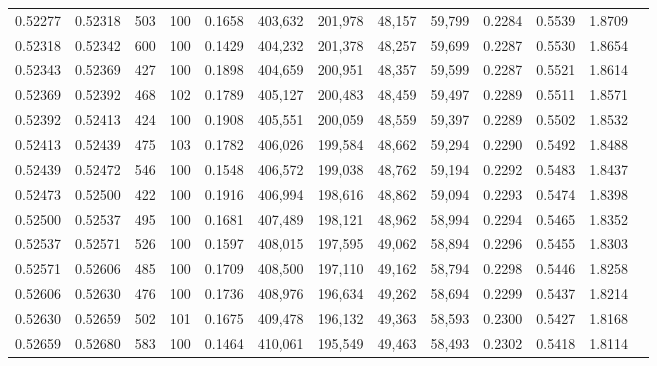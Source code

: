 \begin{tabular}{rrrrrrrrrrrrr}
0.52277 & 0.52318 &   503 & 100 &                                     0.1658 & 403,632 & 201,978 &  48,157 &  59,799 & 0.2284 & 0.5539 & 1.8709 \\
0.52318 & 0.52342 &   600 & 100 &                                     0.1429 & 404,232 & 201,378 &  48,257 &  59,699 & 0.2287 & 0.5530 & 1.8654 \\
0.52343 & 0.52369 &   427 & 100 &                                     0.1898 & 404,659 & 200,951 &  48,357 &  59,599 & 0.2287 & 0.5521 & 1.8614 \\
0.52369 & 0.52392 &   468 & 102 &                                     0.1789 & 405,127 & 200,483 &  48,459 &  59,497 & 0.2289 & 0.5511 & 1.8571 \\
0.52392 & 0.52413 &   424 & 100 &                                     0.1908 & 405,551 & 200,059 &  48,559 &  59,397 & 0.2289 & 0.5502 & 1.8532 \\
0.52413 & 0.52439 &   475 & 103 &                                     0.1782 & 406,026 & 199,584 &  48,662 &  59,294 & 0.2290 & 0.5492 & 1.8488 \\
0.52439 & 0.52472 &   546 & 100 &                                     0.1548 & 406,572 & 199,038 &  48,762 &  59,194 & 0.2292 & 0.5483 & 1.8437 \\
0.52473 & 0.52500 &   422 & 100 &                                     0.1916 & 406,994 & 198,616 &  48,862 &  59,094 & 0.2293 & 0.5474 & 1.8398 \\
0.52500 & 0.52537 &   495 & 100 &                                     0.1681 & 407,489 & 198,121 &  48,962 &  58,994 & 0.2294 & 0.5465 & 1.8352 \\
0.52537 & 0.52571 &   526 & 100 &                                     0.1597 & 408,015 & 197,595 &  49,062 &  58,894 & 0.2296 & 0.5455 & 1.8303 \\
0.52571 & 0.52606 &   485 & 100 &                                     0.1709 & 408,500 & 197,110 &  49,162 &  58,794 & 0.2298 & 0.5446 & 1.8258 \\
0.52606 & 0.52630 &   476 & 100 &                                     0.1736 & 408,976 & 196,634 &  49,262 &  58,694 & 0.2299 & 0.5437 & 1.8214 \\
0.52630 & 0.52659 &   502 & 101 &                                     0.1675 & 409,478 & 196,132 &  49,363 &  58,593 & 0.2300 & 0.5427 & 1.8168 \\
0.52659 & 0.52680 &   583 & 100 &                                     0.1464 & 410,061 & 195,549 &  49,463 &  58,493 & 0.2302 & 0.5418 & 1.8114 \\

\end{tabular}
